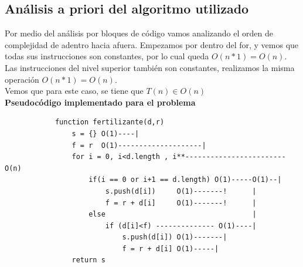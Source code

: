 \documentclass{article}
\begin{document}
    \subsection{Análisis a priori del algoritmo utilizado }
    Por medio del análisis por bloques de código vamos analizando el orden de complejidad de adentro hacia afuera. Empezamos por dentro del for, y vemos que todas sus instrucciones son constantes, por lo cual queda $O(n*1) = O(n)$. Las instrucciones del nivel superior también son constantes, realizamos la misma operación $O(n*1) = O(n)$.\\Vemos que para este caso, se tiene que $T(n) \in O(n)$\\
    \textbf{Pseudocódigo implementado para el problema}
        \begin{verbatim}
            function fertilizante(d,r)
                s = {} O(1)----|
                f = r  O(1)--------------------|
                for i = 0, i<d.length , i**------------------------O(n)
                    if(i == 0 or i+1 == d.length) O(1)-----O(1)--|
                        s.push(d[i])     O(1)-------!      |
                        f = r + d[i]     O(1)-------!      |
                    else                                   |
                        if (d[i]<f) -------------- O(1)----|
                            s.push(d[i]) O(1)-------|
                            f = r + d[i] O(1)-----|
                return s
        \end{verbatim}\\
\end{document}
